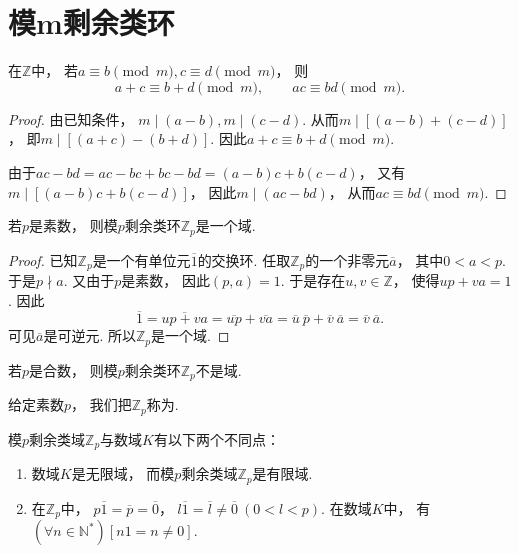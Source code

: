 \section{模m剩余类环}
\begin{proposition}
在\(\mathbb{Z}\)中，
若\(a\equiv b\pmod m,
c\equiv d\pmod m\)，
则\[
	a+c\equiv b+d\pmod m, \qquad
	ac\equiv bd\pmod m.
\]
\begin{proof}
由已知条件，
\(m\mid(a-b),
m\mid(c-d)\).
从而\(m\mid[(a-b)+(c-d)]\)，
即\(m\mid[(a+c)-(b+d)]\).
因此\(a+c\equiv b+d\pmod m\).

由于\(ac-bd
=ac-bc+bc-bd
=(a-b)c+b(c-d)\)，
又有\(m\mid[(a-b)c+b(c-d)]\)，
因此\(m\mid(ac-bd)\)，
从而\(ac\equiv bd\pmod m\).
\end{proof}
\end{proposition}

\begin{theorem}
若\(p\)是素数，
则模\(p\)剩余类环\(\mathbb{Z}_p\)是一个域.
\begin{proof}
已知\(\mathbb{Z}_p\)是一个有单位元\(\overline1\)的交换环.
任取\(\mathbb{Z}_p\)的一个非零元\(\overline{a}\)，
其中\(0<a<p\).
于是\(p \nmid a\).
又由于\(p\)是素数，
因此\((p,a)=1\).
于是存在\(u,v\in\mathbb{Z}\)，
使得\(up+va=1\).
因此\[
	\overline1
	=\overline{up+va}
	=\overline{up}
	+\overline{va}
	=\overline{u}~\overline{p}
	+\overline{v}~\overline{a}
	=\overline{v}~\overline{a}.
\]
可见\(\overline{a}\)是可逆元.
所以\(\mathbb{Z}_p\)是一个域.
\end{proof}
\end{theorem}

\begin{theorem}
若\(p\)是合数，
则模\(p\)剩余类环\(\mathbb{Z}_p\)不是域.
\end{theorem}

给定素数\(p\)，
我们把\(\mathbb{Z}_p\)称为.

模\(p\)剩余类域\(\mathbb{Z}_p\)与数域\(K\)有以下两个不同点：
\begin{enumerate}
	\item 数域\(K\)是无限域，
	而模\(p\)剩余类域\(\mathbb{Z}_p\)是有限域.

	\item 在\(\mathbb{Z}_p\)中，
	\(p\overline1
	=\overline{p}
	=\overline0\)，
	\(l\overline1
	=\overline{l}
	\neq\overline0\ (0<l<p)\).
	在数域\(K\)中，
	有\((\forall n\in\mathbb{N}^*)[n1=n\neq0]\).
\end{enumerate}

